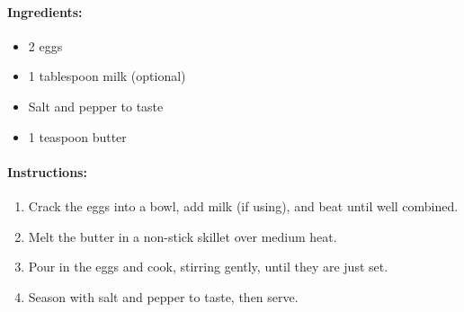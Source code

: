\paragraph{Ingredients:}

\begin{itemize}
\item 2 eggs
\item 1 tablespoon milk (optional)
\item Salt and pepper to taste
\item 1 teaspoon butter
\end{itemize}

\paragraph{Instructions:}

\begin{enumerate}
\item Crack the eggs into a bowl, add milk (if using), and beat until well combined.
\item Melt the butter in a non-stick skillet over medium heat.
\item Pour in the eggs and cook, stirring gently, until they are just set.
\item Season with salt and pepper to taste, then serve.
\end{enumerate}
